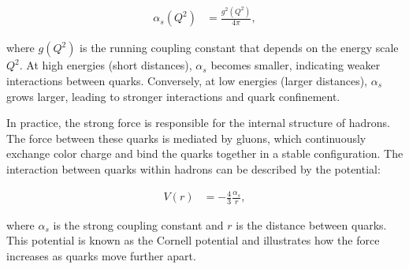 \begin{align}
  \alpha_s(Q^2) &= \frac{g^2(Q^2)}{4 \pi},
\end{align}

where \( g(Q^2) \) is the running coupling constant that depends on the energy scale \( Q^2 \).
At high energies (short distances), \( \alpha_s \) becomes smaller, indicating weaker interactions between quarks.
Conversely, at low energies (larger distances), \( \alpha_s \) grows larger, leading to stronger interactions and quark confinement.

In practice, the strong force is responsible for the internal structure of hadrons.
The force between these quarks is mediated by gluons, which continuously exchange color charge and bind the quarks together in a stable configuration.
The interaction between quarks within hadrons can be described by the potential:

\begin{align}
  V(r) &= -\frac{4}{3} \frac{\alpha_s}{r},
\end{align}

where \( \alpha_s \) is the strong coupling constant and \( r \) is the distance between quarks.
This potential is known as the Cornell potential and illustrates how the force increases as quarks move further apart.

